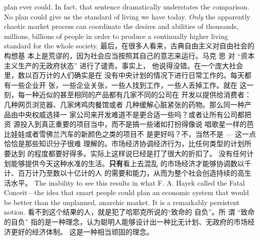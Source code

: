 \begin{paracol}{2}
plan ever could. In fact, that sentence dramatically understates
the comparison. No plan could give us the standard of living we
have today. \textit{Only} the apparently chaotic market process can coordinate the desires and abilities of thousands, millions, billions
of people in order to produce a continually higher living standard for the whole society.
\switchcolumn
最后，在很多人看来，古典自由主义对自由社会的构想基
本上是荒谬的，因为社会应当按照其自己的意志来运行。马克
思 对 “资本主义生产的无政府状态” 进行了谴责。事实上，
他说得没错。在一个庞大社会里，数以百万计的人们确实是在
没有中央计划的情况下进行日常工作的。每天都有一些企业开
张，一些企业关张，一些人找到工作，一些人丢掉工作。就在
这一刻，每一种近似的甚至相同的产品都有几家不同的公司在
开发以提供给消费者：几种网页浏览器、几家烤鸡肉餐馆或者
几种缓解心脏紧张的药物。那么同一种产品由中央权威选择一
家公司来开发难道不是更合适一些吗？或者让所有公司都把资
源投入到真正重要的项目当中，而不是搞一些诸如打扮得像说
唱歌星一样的芭比娃娃或者雪佛兰汽车的新颜色之类的项目不
是更好吗？不，当然不是 --- 这一点恰恰是那些知识分子很难
理解的。市场经济协调经济行为，比任何类型的计划所要达到
的程度都要好得多。实际上这样说巳经是打了很大的折扣了。
没有任何计划能够提供今天这种水准的生活。\textbf{只有}看上去混乱
的市场经济才能够协调数以千计、百万计乃至数以十亿计的人
的需要和能力，从而为整个社会创造持续的高生活水平。
\switchcolumn*
The inability to see this results in what F. A. Hayek called the
Fatal Conceit---the idea that smart people could plan an economic system that would be better than the unplanned, anarchic market. It is a remarkably persistent notion.
\switchcolumn
看不到这个结果的人，就是犯了哈耶克所说的“致命的
自负”。所 谓 “致命的自负” 指的是一种理念，认为聪明人能够设计出一种比无计划、无政府的市场经济更好的经济体制。
这是一种相当顽固的理念。


\end{paracol}
